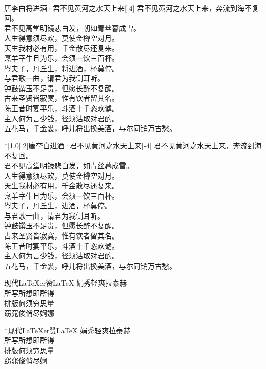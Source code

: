 \documentclass{ctexart}
\begin{document}
\centering

\begin{poem}[1.0][2]{唐}{李白}{将进酒·君不见黄河之水天上来}[-4]
君不见黄河之水天上来，奔流到海不复回。\\
君不见高堂明镜悲白发，朝如青丝暮成雪。\\
人生得意须尽欢，莫使金樽空对月。\\
天生我材必有用，千金散尽还复来。\\
烹羊宰牛且为乐，会须一饮三百杯。\\
岑夫子，丹丘生，将进酒，杯莫停。\\
与君歌一曲，请君为我侧耳听。\\
钟鼓馔玉不足贵，但愿长醉不复醒。\\
古来圣贤皆寂寞，惟有饮者留其名。\\
陈王昔时宴平乐，斗酒十千恣欢谑。\\
主人何为言少钱，径须沽取对君酌。\\
五花马，千金裘，呼儿将出换美酒，与尔同销万古愁。
\end{poem}

\begin{poem}*[1.0][2]{唐}{李白}{进酒·君不见黄河之水天上来}[-4]
君不见黄河之水天上来，奔流到海不复回。\\
君不见高堂明镜悲白发，如青丝暮成雪。\\
人生得意须尽欢，莫使金樽空对月。\\
天生我材必有用，千金散尽还复来。\\
烹羊宰牛且为乐，会须一饮三百杯。\\
岑夫子，丹丘生，进酒，杯莫停。\\
与君歌一曲，请君为我侧耳听。\\
钟鼓馔玉不足贵，但愿长醉不复醒。\\
古来圣贤皆寂寞，惟有饮者留其名。\\
陈王昔时宴平乐，斗酒十千恣欢谑。\\
主人何为言少钱，径须沽取对君酌。\\
五花马，千金裘，呼儿将出换美酒，与尔同销万古愁。
\end{poem}

  \begin{poem}{现代}{\LaTeX{}er}{赞\textbullet{}\LaTeX{}}
    娟秀轻爽拉泰赫\\
    所写所想即所得\\
    排版何须穷思量\\
    窈窕俊俏尽婀娜
  \end{poem}
  
  \begin{poem}*{现代}{\LaTeX{}er}{赞\textbullet{}\LaTeX{}}
    娟秀轻爽拉泰赫\\
    所写所想即所得\\
    排版何须穷思量\\
    窈窕俊俏尽婀
  \end{poem}
\end{document}
